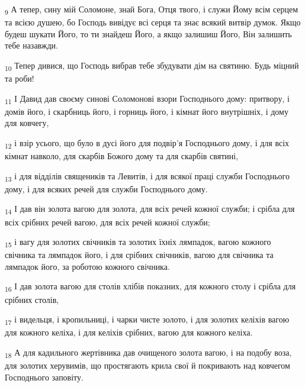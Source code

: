 \begin{tcolorbox}
\textsubscript{9} А тепер, сину мій Соломоне, знай Бога, Отця твого, і служи Йому всім серцем та всією душею, бо Господь вивідує всі серця та знає всякий витвір думок. Якщо будеш шукати Його, то ти знайдеш Його, а якщо залишиш Його, Він залишить тебе назавжди.
\end{tcolorbox}
\begin{tcolorbox}
\textsubscript{10} Тепер дивися, що Господь вибрав тебе збудувати дім на святиню. Будь міцний та роби!
\end{tcolorbox}
\begin{tcolorbox}
\textsubscript{11} І Давид дав своєму синові Соломонові взори Господнього дому: притвору, і домів його, і скарбниць його, і горниць його, і кімнат його внутрішніх, і дому для ковчегу,
\end{tcolorbox}
\begin{tcolorbox}
\textsubscript{12} і взір усього, що було в дусі його для подвір'я Господнього дому, і для всіх кімнат навколо, для скарбів Божого дому та для скарбів святині,
\end{tcolorbox}
\begin{tcolorbox}
\textsubscript{13} і для відділів священиків та Левитів, і для всякої праці служби Господнього дому, і для всяких речей для служби Господнього дому.
\end{tcolorbox}
\begin{tcolorbox}
\textsubscript{14} І дав він золота вагою для золота, для всіх речей кожної служби; і срібла для всіх срібних речей вагою, для всіх речей кожної служби;
\end{tcolorbox}
\begin{tcolorbox}
\textsubscript{15} і вагу для золотих свічників та золотих їхніх лямпадок, вагою кожного свічника та лямпадок його, і для срібних свічників, вагою для свічника та лямпадок його, за роботою кожного свічника.
\end{tcolorbox}
\begin{tcolorbox}
\textsubscript{16} І дав золота вагою для столів хлібів показних, для кожного столу і срібла для срібних столів,
\end{tcolorbox}
\begin{tcolorbox}
\textsubscript{17} і видельця, і кропильниці, і чарки чисте золото, і для золотих келіхів вагою для кожного келіха, і для келіхів срібних, вагою для кожного келіха.
\end{tcolorbox}
\begin{tcolorbox}
\textsubscript{18} А для кадильного жертівника дав очищеного золота вагою, і на подобу воза, для золотих херувимів, що простягають крила свої й покривають над ковчегом Господнього заповіту.
\end{tcolorbox}
